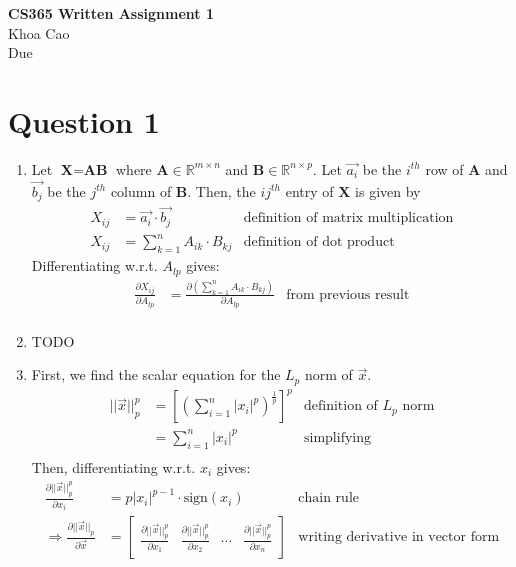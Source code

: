 \documentclass[11pt]{article}
\newcommand{\pd}[2]{\frac{\partial #1}{\partial #2}}
\begin{document}
\begin{center}
    \textbf{CS365 Written Assignment 1} \\
    Khoa Cao \\
    Due 
\end{center}

\section*{Question 1}
\begin{enumerate}
    \item Let $\textbf{X} = \textbf{AB}$ where $\textbf{A} \in \mathbb{R}^{m \times n}$ and $\textbf{B} \in \mathbb{R}^{n \times p}$. Let $\vec{a_i}$ be the $i^{th}$ row of $\textbf{A}$ and $\vec{b_j}$ be the $j^{th}$ column of $\textbf{B}$. Then, the $ij^{th}$ entry of $\textbf{X}$ is given by
    \begin{align*}
        X_{ij} &= \vec{a_i} \cdot \vec{b_j} & \text{definition of matrix multiplication} \\
        X_{ij} &= \sum_{k=1}^{n} A_{ik} \cdot B_{kj} & \text{definition of dot product}
    \end{align*}
    Differentiating w.r.t. $A_{lp}$ gives:
    \begin{align*}
        \pd{X_{ij}}{A_{lp}} &= \pd{(\sum_{k=1}^{n} A_{ik} \cdot B_{kj})}{A_{lp}} & \text{from previous result} \\
    \end{align*}
    \item TODO
    \item First, we find the scalar equation for the $L_p$ norm of $\vec{x}$.
    \begin{align*}
        ||\vec{x}||_p^p &= \left[ \left(\sum_{i=1}^{n} |x_i|^p \right)^{\frac{1}{p}} \right]^p & \text{definition of } L_p \text{ norm} \\
        &= \sum_{i=1}^{n} |x_i|^p & \text{simplifying} \\
    \end{align*}
    Then, differentiating w.r.t. $x_i$ gives:
    \begin{align*}
        \pd{||\vec{x}||_p^p}{x_i} &= p |x_i|^{p - 1} \cdot \text{sign}(x_i) & \text{chain rule} \\
        \Rightarrow \pd{||\vec{x}||_p}{\vec{x}} &= \begin{bmatrix}
            \pd{||\vec{x}||_p^p}{x_1} & \pd{||\vec{x}||_p^p}{x_2} & \cdots & \pd{||\vec{x}||_p^p}{x_n}
        \end{bmatrix} & \text{writing derivative in vector form} \\

\end{align*}
\end{enumerate}
\end{document}
